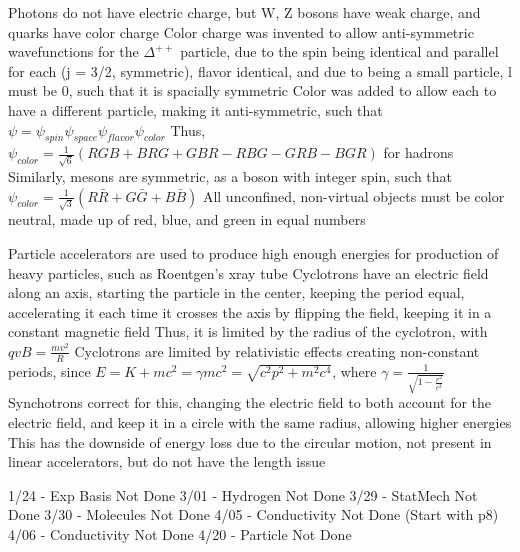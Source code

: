 \documentclass[11 pt, twoside]{article}
\newenvironment{outline*}
{
	\begin{outline}[enumerate]
	}
	{\end{outline}
}
\begin{document}
\begin{outline*}
\1 Photons do not have electric charge, but W, Z bosons have weak charge, and quarks have color charge
\1 Color charge was invented to allow anti-symmetric wavefunctions for the $\Delta^{++}$ particle, due to the spin being identical and parallel for each (j = 3/2, symmetric), flavor identical, and due to being a small particle, l must be 0, such that it is spacially symmetric
	\2 Color was added to allow each to have a different particle, making it anti-symmetric, such that $\psi = \psi_{spin}\psi_{space}\psi_{flavor}\psi_{color}$
		\3 Thus, $\psi_{color} = \frac{1}{\sqrt{6}}(RGB + BRG + GBR - RBG - GRB - BGR)$ for hadrons
		\3 Similarly, mesons are symmetric, as a boson with integer spin, such that $\psi_{color} = \frac{1}{\sqrt{3}}(R\bar{R} + G\bar{G} + B\bar{B})$
	\2 All unconfined, non-virtual objects must be color neutral, made up of red, blue, and green in equal numbers

\1 Particle accelerators are used to produce high enough energies for production of heavy particles, such as Roentgen's xray tube
	\2 Cyclotrons have an electric field along an axis, starting the particle in the center, keeping the period equal, accelerating it each time it crosses the axis by flipping the field, keeping it in a constant magnetic field
		\3 Thus, it is limited by the radius of the cyclotron, with $qvB = \frac{mv^2}{R}$
	\2 Cyclotrons are limited by relativistic effects creating non-constant periods, since $E = K + mc^2 = \gamma mc^2 = \sqrt{c^2p^2 + m^2c^4}$, where $\gamma = \frac{1}{\sqrt{1 - \frac{v^2}{c^2}}}$
		\3 Synchotrons correct for this, changing the electric field to both account for the electric field, and keep it in a circle with the same radius, allowing higher energies
		\3 This has the downside of energy loss due to the circular motion, not present in linear accelerators, but do not have the length issue

1/24 - Exp Basis Not Done
3/01 - Hydrogen Not Done
3/29 - StatMech Not Done
3/30 - Molecules Not Done
4/05 - Conductivity Not Done (Start with p8)
4/06 - Conductivity Not Done
4/20 - Particle Not Done

\end{outline*}
\end{document}
